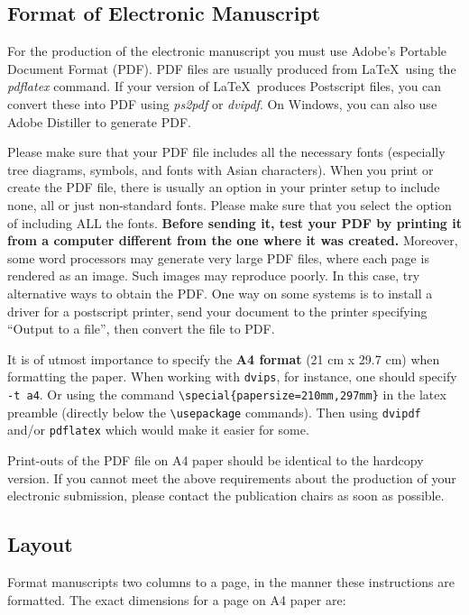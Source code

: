 \documentclass[11pt,a4paper]{article}
\begin{document}
\subsection{Format of Electronic Manuscript}
\label{sect:pdf}

For the production of the electronic manuscript you must use Adobe's
Portable Document Format (PDF). PDF files are usually produced from
\LaTeX\ using the \textit{pdflatex} command. If your version of
\LaTeX\ produces Postscript files, you can convert these into PDF
using \textit{ps2pdf} or \textit{dvipdf}. On Windows, you can also use
Adobe Distiller to generate PDF.

Please make sure that your PDF file includes all the necessary fonts
(especially tree diagrams, symbols, and fonts with Asian
characters). When you print or create the PDF file, there is usually
an option in your printer setup to include none, all or just
non-standard fonts.  Please make sure that you select the option of
including ALL the fonts. \textbf{Before sending it, test your PDF by
  printing it from a computer different from the one where it was
  created.} Moreover, some word processors may generate very large PDF
files, where each page is rendered as an image. Such images may
reproduce poorly. In this case, try alternative ways to obtain the
PDF. One way on some systems is to install a driver for a postscript
printer, send your document to the printer specifying ``Output to a
file'', then convert the file to PDF.

It is of utmost importance to specify the \textbf{A4 format} (21 cm
x 29.7 cm) when formatting the paper. When working with
{\tt dvips}, for instance, one should specify {\tt -t a4}.
Or using the command \verb|\special{papersize=210mm,297mm}| in the latex
preamble (directly below the \verb|\usepackage| commands). Then using 
{\tt dvipdf} and/or {\tt pdflatex} which would make it easier for some.

Print-outs of the PDF file on A4 paper should be identical to the
hardcopy version. If you cannot meet the above requirements about the
production of your electronic submission, please contact the
publication chairs as soon as possible.

\subsection{Layout}
\label{ssec:layout}

Format manuscripts two columns to a page, in the manner these
instructions are formatted. The exact dimensions for a page on A4
paper are:
\end{document}
